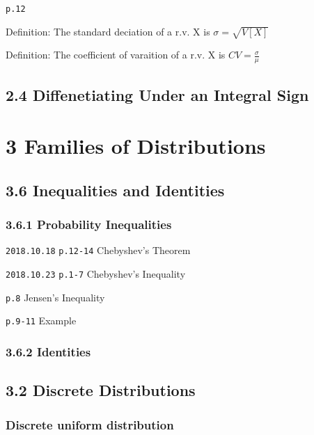 \documentclass[]{tufte-book}
\begin{document}
\texttt{p.12}

Definition: The standard deciation of a r.v. X is \(\sigma=\sqrt{V[X]}\)

Definition: The coefficient of varaition of a r.v. X is
\(CV=\frac{\sigma}{\mu}\)

\hypertarget{diffenetiating-under-an-integral-sign}{%
\subsection{2.4 Diffenetiating Under an Integral
Sign}\label{diffenetiating-under-an-integral-sign}}

\hypertarget{families-of-distributions}{%
\section{3 Families of Distributions}\label{families-of-distributions}}

\hypertarget{inequalities-and-identities}{%
\subsection{3.6 Inequalities and
Identities}\label{inequalities-and-identities}}

\hypertarget{probability-inequalities}{%
\subsubsection{3.6.1 Probability
Inequalities}\label{probability-inequalities}}

\texttt{2018.10.18} \texttt{p.12-14} Chebyshev's Theorem

\texttt{2018.10.23} \texttt{p.1-7} Chebyshev's Inequality

\texttt{p.8} Jensen's Inequality

\texttt{p.9-11} Example

\hypertarget{identities}{%
\subsubsection{3.6.2 Identities}\label{identities}}

\hypertarget{discrete-distributions}{%
\subsection{3.2 Discrete Distributions}\label{discrete-distributions}}

\hypertarget{discrete-uniform-distribution}{%
\subsubsection{Discrete uniform
distribution}\label{discrete-uniform-distribution}}
\end{document}

